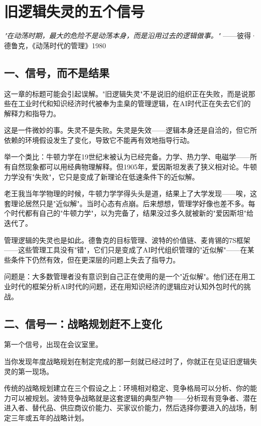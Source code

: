 \chapter{旧逻辑失灵的五个信号}


\textit{"在动荡时期，最大的危险不是动荡本身，而是沿用过去的逻辑做事。"}
——彼得·德鲁克，《动荡时代的管理》1980


\section{一、信号，而不是结果}


这一章的标题可能会引起误解。"旧逻辑失灵"不是说旧的组织正在失败，而是说那些在工业时代和知识经济时代被奉为圭臬的管理逻辑，在AI时代正在失去它们的解释力和指导力。

这是一件微妙的事。失灵不是失败。失灵是失效——逻辑本身还是自洽的，但它所依赖的环境假设发生了变化，导致它不能再有效地指导行动。

举一个类比：牛顿力学在19世纪末被认为已经完备。力学、热力学、电磁学——所有自然现象都可以用经典物理解释。但1905年，爱因斯坦发表了狭义相对论。牛顿力学没有"失败"，它只是变成了新理论在低速条件下的近似解。

老王我当年学物理的时候，牛顿力学学得头头是道，结果上了大学发现——唉，这套理论居然只是"近似解"。当时心态有点崩。后来想想，管理学好像也差不多。每个时代都有自己的"牛顿力学"，以为完备了，结果没过多久就被新的"爱因斯坦"给迭代了。

管理逻辑的失灵也是如此。德鲁克的目标管理、波特的价值链、麦肯锡的7S框架——这些管理工具没有"错"，它们只是变成了AI时代组织管理的"近似解"——在某些条件下仍然有效，但在更深层的问题上失去了指导力。

问题是：大多数管理者没有意识到自己正在使用的是一个"近似解"。他们还在用工业时代的框架分析AI时代的问题，还在用知识经济的逻辑应对认知外包时代的挑战。


\section{二、信号一：战略规划赶不上变化}


第一个信号，出现在会议室里。

当你发现年度战略规划在制定完成的那一刻就已经过时了，你就正在见证旧逻辑失灵的第一现场。

传统的战略规划建立在三个假设之上：环境相对稳定、竞争格局可以分析、你的能力可以被规划。波特竞争战略就是这套逻辑的典型产物——分析现有竞争者、潜在进入者、替代品、供应商议价能力、买家议价能力，然后选择你要进入的战场，制定三年或五年的战略计划。

